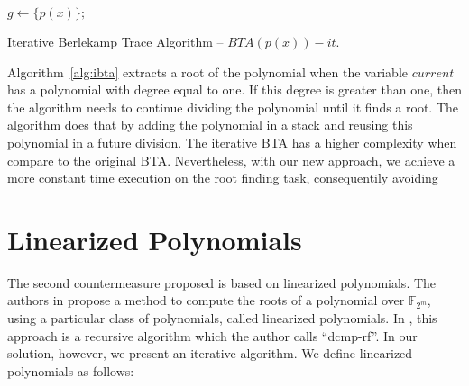 \begin{algorithm}[ht]
    $g \gets \{p(x)\};$ 
 \caption{Iterative Berlekamp Trace Algorithm -- $BTA(p(x))-it$.}
  \label{alg:ibta}
\end{algorithm}

Algorithm~\ref{alg:ibta} extracts a root of the polynomial when the variable $current$ has a polynomial with degree equal to one. If this degree is greater than one, then the algorithm needs to continue dividing the polynomial until it finds a root. The algorithm does that by adding the polynomial in a stack and reusing this polynomial in a future division. The iterative BTA has a higher complexity when compare to the original BTA. Nevertheless, with our new approach, we achieve a more constant time execution on the root finding task, consequentily avoiding 

\section{Linearized Polynomials}
The second countermeasure proposed is based on linearized polynomials. The authors in \cite{fedorenko2002finding} propose a method to compute the roots of a polynomial over $\mathbb{F}_{2^m}$, using a particular class of polynomials, called linearized polynomials. In \cite{strenzke2012fast}, this approach is a recursive algorithm which the author calls ``dcmp-rf''. In our solution, however, we present an iterative algorithm. We define linearized polynomials as follows:

